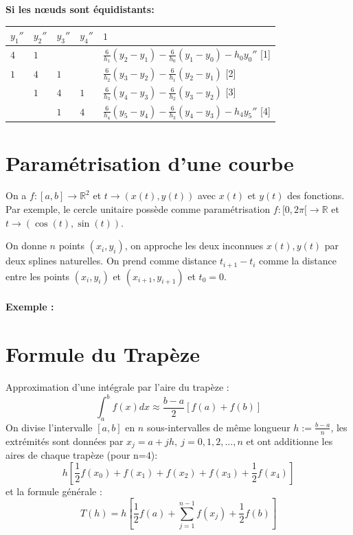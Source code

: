\documentclass[a4paper,9pt]{extarticle}
\begin{document}
\begin{multicols*}{2}
\textbf{Si les nœuds sont équidistants:}

\begin{tabular}{|llll|l|}
$y_1''$      & $y_2''$      & $y_3''$      & $y_4''$      & $1$ \\ \hline
$4$          & $1$          &              &              & $\frac{6}{h_1}(y_2-y_1)-\frac{6}{h_0}(y_1-y_0)-h_0y_0''$  [1]\\
$1$          & $4$          & $1$          &              & $\frac{6}{h_2}(y_3-y_2)-\frac{6}{h_1}(y_2-y_1)$  [2]\\
             & $1$          & $4$          & $1$          & $\frac{6}{h_3}(y_4-y_3)-\frac{6}{h_2}(y_3-y_2)$  [3]\\
             &              & $1$          & $4$          & $\frac{6}{h_4}(y_5-y_4)-\frac{6}{h_3}(y_4-y_3)-h_4y_5''$  [4]
\end{tabular}


\section{Paramétrisation d'une courbe}
On a $f:[a,b] \rightarrow \mathbb{R}^2$ et $t \rightarrow (x(t),y(t))$ avec $x(t)$ et $y(t)$ des fonctions. Par exemple, le cercle unitaire possède comme paramétrisation $f:[0,2\pi[ \rightarrow \mathbb{R}$ et $t\rightarrow (\cos(t),\sin(t))$.

On donne $n$ points $(x_i,y_i)$, on approche les deux inconnues $x(t),y(t)$ par deux splines naturelles. On prend comme distance $t_{i+1}-t_i$ comme la distance entre les points $(x_i,y_i)$ et $(x_{i+1},y_{i+1})$ et $t_0=0$.

\paragraph*{Exemple :}



\section{Formule du Trapèze}
Approximation d'une intégrale par l'aire du trapèze :
$$
\int_a^bf(x)dx\approx\frac{b-a}{2}[f(a)+f(b)]
$$
On divise l'intervalle $[a,b]$ en $n$ sous-intervalles de même longueur $h := \frac{b-a}{n}$, les extrémités sont données par $x_j=a+jh,\ j=0,1,2,...,n$ et ont additionne les aires de chaque trapèze (pour n=$4$):
$$
h[\frac{1}{2}f(x_0)+f(x_1)+f(x_2)+f(x_3)+\frac{1}{2}f(x_4)]
$$
et la formule générale :
$$
T(h)=h[\frac{1}{2}f(a)+\sum_{j=1}^{n-1}f(x_j)+\frac{1}{2}f(b)]
$$


\end{multicols*}
\end{document}
